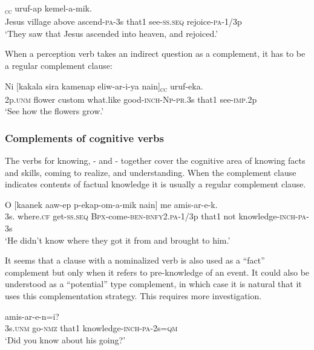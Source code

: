 \ea%
\label{ex:8:x1629}
\textsubscript{\textsc{cc}}  uruf-ap kemel-a-mik.\\
Jesus  village  above  ascend-\textsc{pa}-3s that1 see-\textsc{ss}.\textsc{seq} rejoice-\textsc{pa}-1/3p\\
\glt`They saw that Jesus ascended into heaven, and rejoiced.'
\z


When a perception verb takes an indirect question as a complement, it has to be a regular complement clause:

\ea%
\label{ex:8:x1631}
\gll Ni  [kakala  sira  kamenap  eliw-ar-i-ya  nain]\textsubscript{\textsc{cc}} uruf-eka.\\
2p.\textsc{unm} flower  custom  what.like  good-\textsc{inch}-\textsc{Np}-\textsc{pr}.3s that1 see-\textsc{imp}.2p\\
\glt`See how the flowers grow.'
\z


\subsubsection{Complements of cognitive verbs}

The verbs for knowing, - and - together cover the cognitive area of knowing facts and skills, coming to realize, and understanding. When the complement clause indicates contents of factual knowledge it is usually a regular complement clause.

\ea%
\label{ex:8:x1602}
\gll O  [kaanek  aaw-ep  p-ekap-om-a-mik nain]  me  amis-ar-e-k.\\
3s.   where.\textsc{cf} get-\textsc{ss}.\textsc{seq} \textsc{Bpx}-come-\textsc{ben}-\textsc{bnfy}2.\textsc{pa}-1/3p that1  not  knowledge-\textsc{inch}-\textsc{pa}-3s\\
\glt`He didn't know where they got it from and brought to him.'
\z


It seems that a clause with a nominalized verb is also used as a ``fact'' complement but only when it refers to pre-knowledge of an event. It could also be understood as a ``potential'' type complement, in which case it is natural that it uses this complementation strategy. This requires more investigation. 

\ea%
\label{ex:8:x1605}
  amis-ar-e-n=i? \\
3s.\textsc{unm} go-\textsc{nmz} that1 knowledge-\textsc{inch}-\textsc{pa}-2s=\textsc{qm}\\
\glt`Did you know about his going?'
\z


